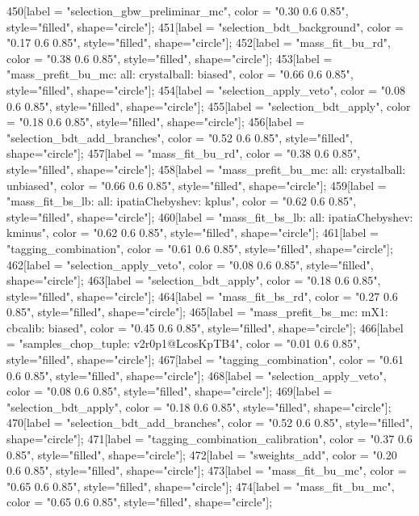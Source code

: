 {	450[label = "selection_gbw_preliminar_mc", color = "0.30 0.6 0.85", style="filled", shape="circle"];
	451[label = "selection_bdt_background", color = "0.17 0.6 0.85", style="filled", shape="circle"];
	452[label = "mass_fit_bu_rd", color = "0.38 0.6 0.85", style="filled", shape="circle"];
	453[label = "mass_prefit_bu_mc\nmassbin: all\nmassmodel: crystalball\ntrigger: biased", color = "0.66 0.6 0.85", style="filled", shape="circle"];
	454[label = "selection_apply_veto", color = "0.08 0.6 0.85", style="filled", shape="circle"];
	455[label = "selection_bdt_apply", color = "0.18 0.6 0.85", style="filled", shape="circle"];
	456[label = "selection_bdt_add_branches", color = "0.52 0.6 0.85", style="filled", shape="circle"];
	457[label = "mass_fit_bu_rd", color = "0.38 0.6 0.85", style="filled", shape="circle"];
	458[label = "mass_prefit_bu_mc\nmassbin: all\nmassmodel: crystalball\ntrigger: unbiased", color = "0.66 0.6 0.85", style="filled", shape="circle"];
	459[label = "mass_fit_bs_lb\nmassbin: all\nmassmodel: ipatiaChebyshev\ntrigger: kplus", color = "0.62 0.6 0.85", style="filled", shape="circle"];
	460[label = "mass_fit_bs_lb\nmassbin: all\nmassmodel: ipatiaChebyshev\ntrigger: kminus", color = "0.62 0.6 0.85", style="filled", shape="circle"];
	461[label = "tagging_combination", color = "0.61 0.6 0.85", style="filled", shape="circle"];
	462[label = "selection_apply_veto", color = "0.08 0.6 0.85", style="filled", shape="circle"];
	463[label = "selection_bdt_apply", color = "0.18 0.6 0.85", style="filled", shape="circle"];
	464[label = "mass_fit_bs_rd", color = "0.27 0.6 0.85", style="filled", shape="circle"];
	465[label = "mass_prefit_bs_mc\nmassbin: mX1\nmassmodel: cbcalib\ntrigger: biased", color = "0.45 0.6 0.85", style="filled", shape="circle"];
	466[label = "samples_chop_tuple\nversion: v2r0p1@LcosKpTB4", color = "0.01 0.6 0.85", style="filled", shape="circle"];
	467[label = "tagging_combination", color = "0.61 0.6 0.85", style="filled", shape="circle"];
	468[label = "selection_apply_veto", color = "0.08 0.6 0.85", style="filled", shape="circle"];
	469[label = "selection_bdt_apply", color = "0.18 0.6 0.85", style="filled", shape="circle"];
	470[label = "selection_bdt_add_branches", color = "0.52 0.6 0.85", style="filled", shape="circle"];
	471[label = "tagging_combination_calibration", color = "0.37 0.6 0.85", style="filled", shape="circle"];
	472[label = "sweights_add", color = "0.20 0.6 0.85", style="filled", shape="circle"];
	473[label = "mass_fit_bu_mc", color = "0.65 0.6 0.85", style="filled", shape="circle"];
	474[label = "mass_fit_bu_mc", color = "0.65 0.6 0.85", style="filled", shape="circle"];
}
